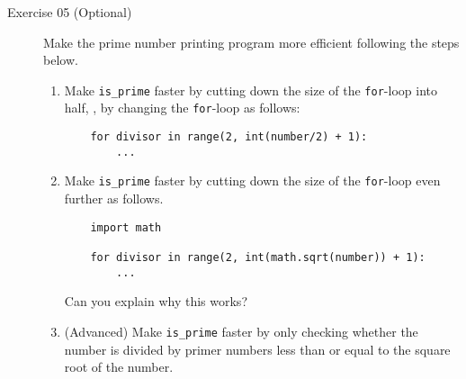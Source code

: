 \documentclass{article}
\begin{document}
\begin{description}
\item[Exercise 05 (Optional)]
Make the prime number printing program more efficient following the steps below.

\begin{enumerate}
\item Make \verb+is_prime+ faster by cutting down the size of the \verb+for+-loop into half,
\ie, by changing the \verb+for+-loop as follows:
\begin{verbatim}
    for divisor in range(2, int(number/2) + 1):
        ...
\end{verbatim}

\item Make \verb+is_prime+ faster by cutting down the size of the \verb+for+-loop even further
as follows.
\begin{verbatim}
    import math

    for divisor in range(2, int(math.sqrt(number)) + 1):
        ...
\end{verbatim}

Can you explain why this works?

\item (Advanced) Make \verb+is_prime+ faster by only checking whether the number is divided by primer numbers less than or equal to
the square root of the number.


\end{enumerate}

\end{description}
\end{document}
